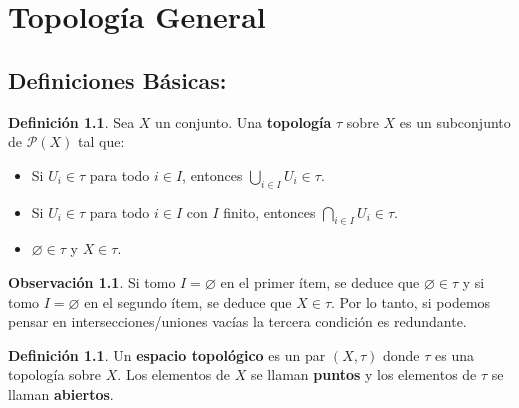 \documentclass[12pt]{book}
\theoremstyle{definition}
\newtheorem{obs}[teo]{Observación}
\newtheorem{defn}[teo]{Definición}
\newcommand{\PP}{\mathscr{P}}
\let\emptyset\varnothing
\begin{document}
\clearpage\tableofcontents\newpage{}

\chapter{Topología General}

\section{Definiciones Básicas:}

\begin{defn}
Sea $X$ un conjunto. Una \textbf{topología} $\tau$ sobre $X$ es un subconjunto de $\PP(X)$ tal que:
\begin{itemize}
\item Si $U_i\in \tau$ para todo $i\in I$, entonces $\displaystyle\bigcup_{i\in I} U_i \in \tau$.
\item Si $U_i\in \tau$ para todo $i\in I$ con $I$ finito, entonces $\displaystyle\bigcap_{i\in I} U_i \in \tau$.
\item $\emptyset\in\tau$ y $X\in\tau$.
\end{itemize}
\end{defn}

\begin{obs}
Si tomo $I=\emptyset$ en el primer ítem, se deduce que $\emptyset\in\tau$ y si tomo $I=\emptyset$ en el segundo ítem, se deduce que $X\in \tau$. Por lo tanto, si podemos pensar en intersecciones/uniones vacías la tercera condición es redundante.
\end{obs}

\begin{defn}
Un \textbf{espacio topológico} es un par $(X,\tau)$ donde $\tau$ es una topología sobre $X$. Los elementos de $X$ se llaman \textbf{puntos} y los elementos de $\tau$ se llaman \textbf{abiertos}.
\end{defn}
\end{document}
